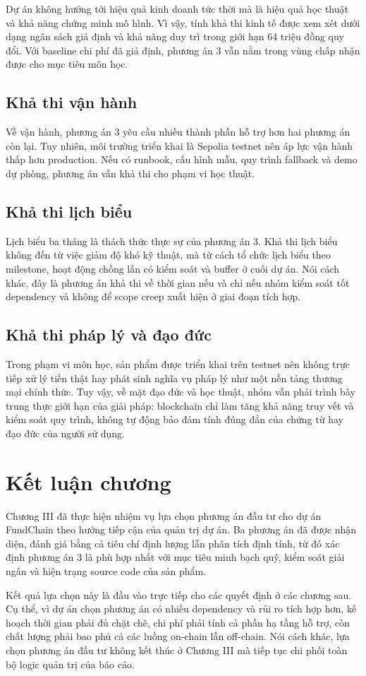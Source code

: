 Dự án không hướng tới hiệu quả kinh doanh tức thời mà là hiệu quả học thuật và khả năng chứng minh mô hình. Vì vậy, tính khả thi kinh tế được xem xét dưới dạng ngân sách giả định và khả năng duy trì trong giới hạn 64 triệu đồng quy đổi. Với baseline chi phí đã giả định, phương án 3 vẫn nằm trong vùng chấp nhận được cho mục tiêu môn học.

\subsection{Khả thi vận hành}

Về vận hành, phương án 3 yêu cầu nhiều thành phần hỗ trợ hơn hai phương án còn lại. Tuy nhiên, môi trường triển khai là Sepolia testnet nên áp lực vận hành thấp hơn production. Nếu có runbook, cấu hình mẫu, quy trình fallback và demo dự phòng, phương án vẫn khả thi cho phạm vi học thuật.

\subsection{Khả thi lịch biểu}

Lịch biểu ba tháng là thách thức thực sự của phương án 3. Khả thi lịch biểu không đến từ việc giảm độ khó kỹ thuật, mà từ cách tổ chức lịch biểu theo milestone, hoạt động chồng lấn có kiểm soát và buffer ở cuối dự án. Nói cách khác, đây là phương án khả thi về thời gian nếu và chỉ nếu nhóm kiểm soát tốt dependency và không để scope creep xuất hiện ở giai đoạn tích hợp.

\subsection{Khả thi pháp lý và đạo đức}

Trong phạm vi môn học, sản phẩm được triển khai trên testnet nên không trực tiếp xử lý tiền thật hay phát sinh nghĩa vụ pháp lý như một nền tảng thương mại chính thức. Tuy vậy, về mặt đạo đức và học thuật, nhóm vẫn phải trình bày trung thực giới hạn của giải pháp: blockchain chỉ làm tăng khả năng truy vết và kiểm soát quy trình, không tự động bảo đảm tính đúng đắn của chứng từ hay đạo đức của người sử dụng.

\section{Kết luận chương}

Chương III đã thực hiện nhiệm vụ lựa chọn phương án đầu tư cho dự án FundChain theo hướng tiếp cận của quản trị dự án. Ba phương án đã được nhận diện, đánh giá bằng cả tiêu chí định lượng lẫn phân tích định tính, từ đó xác định phương án 3 là phù hợp nhất với mục tiêu minh bạch quỹ, kiểm soát giải ngân và hiện trạng source code của sản phẩm.

Kết quả lựa chọn này là đầu vào trực tiếp cho các quyết định ở các chương sau. Cụ thể, vì dự án chọn phương án có nhiều dependency và rủi ro tích hợp hơn, kế hoạch thời gian phải đủ chặt chẽ, chi phí phải tính cả phần hạ tầng hỗ trợ, còn chất lượng phải bao phủ cả các luồng on-chain lẫn off-chain. Nói cách khác, lựa chọn phương án đầu tư không kết thúc ở Chương III mà tiếp tục chi phối toàn bộ logic quản trị của báo cáo.
